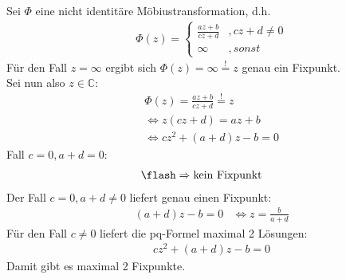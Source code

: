 \section{}
\subsection{}
    Sei $\Phi$ eine nicht identitäre Möbiustransformation, d.h.
    \begin{align}
		&\Phi (z)= 
		\begin{cases}
            \frac{az+b}{cz+d} &,cz+d \neq 0\\
            \infty & ,sonst
        \end{cases}
	\end{align}
	Für den Fall $z=\infty$ ergibt sich $\Phi(z)=\infty \overset{!}{=}z$ genau ein Fixpunkt.\\
	Sei nun also $z \in \mathbb{C}$:
	\begin{align}
		&\Phi(z)=\frac{az+b}{cz+d}\overset{!}{=}z\\
		&\Leftrightarrow z(cz+d)=az+b\\
		&\Leftrightarrow cz^2+(a+d)z-b=0
	\end{align}
	Fall $c=0, a+d=0$:
    \begin{align}
		& \flash \Rightarrow \text{kein Fixpunkt}
	\end{align}
    Der Fall $c=0, a+d \neq 0$ liefert genau einen Fixpunkt:
    \begin{align}
		& (a+d)z-b=0
        & \Leftrightarrow z= \frac{b}{a+d}
	\end{align}
	Für den Fall $c \neq 0$ liefert die pq-Formel maximal 2 Lösungen:
    \begin{align}
		& cz^2+(a+d)z-b=0
	\end{align}
	Damit gibt es maximal 2 Fixpunkte.
\subsection{}